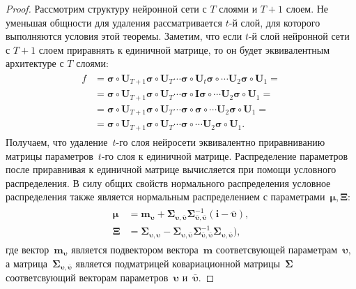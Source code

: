 \documentclass[12pt]{a&t}
\begin{document}
\begin{proof}
Рассмотрим структуру нейронной сети с $T$ слоями и $T+1$ слоем. Не уменьшая общности для удаления рассматривается $t$-й слой, для которого выполняются условия этой теоремы. Заметим, что если $t$-й слой нейронной сети с $T+1$ слоем приравнять к единичной матрице, то он будет эквивалентным архитектуре с $T$ слоями:
\begin{gather}
\label{eq:ap:tr:2:1}
\begin{aligned}
f &= \bm{\sigma} \circ \mathbf{U}_{T+1}\bm{\sigma} \circ \mathbf{U}_T \cdots \bm{\sigma} \circ \mathbf{U}_t\bm{\sigma} \circ \cdots  \mathbf{U}_2\bm{\sigma} \circ \mathbf{U}_1 =\\
&=  \bm{\sigma} \circ \mathbf{U}_{T+1}\bm{\sigma} \circ \mathbf{U}_T \cdots \bm{\sigma} \circ \mathbf{I}\bm{\sigma} \circ \cdots  \mathbf{U}_2\bm{\sigma} \circ \mathbf{U}_1 =\\
&=  \bm{\sigma} \circ \mathbf{U}_{T+1}\bm{\sigma} \circ \mathbf{U}_T \cdots \bm{\sigma} \circ \bm{\sigma} \circ \cdots  \mathbf{U}_2\bm{\sigma} \circ \mathbf{U}_1 =\\
&=  \bm{\sigma} \circ \mathbf{U}_{T+1}\bm{\sigma} \circ \mathbf{U}_T \cdots \bm{\sigma} \circ \cdots  \mathbf{U}_2\bm{\sigma} \circ \mathbf{U}_1.
\end{aligned}
\end{gather}
Получаем, что удаление~$t$-го слоя нейросети эквивалентно приравниванию матрицы параметров~$t$-го слоя к единичной матрице. Распределение параметров после приравнивая к единичной матрице вычисляется при помощи условного распределения. В силу общих свойств нормального распределения условное распределения также является нормальным распределением с параметрами~$\bm{\mu}, \bm{\Xi}:$
\begin{gather}
\label{eq:ap:tr:2:2}
\begin{aligned}
\bm{\mu} &= \mathbf{m}_{\bm{\upsilon}}+\bm{\Sigma}_{\bm{\upsilon},\bar{\bm{\upsilon}}} \bm{\Sigma}_{\bar{\bm{\upsilon}},\bar{\bm{\upsilon}}}^{-1} \left(\mathbf{i} - \bar{\bm{\upsilon}}\right), \\
\bm{\Xi} &= \bm{\Sigma}_{\bm{\upsilon},\bm{\upsilon}} - \bm{\Sigma}_{\bm{\upsilon},\bar{\bm{\upsilon}}}\bm{\Sigma}_{\bar{\bm{\upsilon}},\bar{\bm{\upsilon}}}^{-1}\bm{\Sigma}_{\bm{\upsilon},\bar{\bm{\upsilon}}}\bigr),
\end{aligned}
\end{gather}
где вектор~$\mathbf{m}_{\bm{\upsilon}}$ является подвектором вектора~$\mathbf{m}$ соответсвующей параметрам~$\bm{\upsilon},$ а матрица~$\bm{\Sigma}_{\bm{\upsilon},\bar{\bm{\upsilon}}}$ является подматрицей ковариационной матрицы~$\bm{\Sigma}$ соответсвующий векторам параметров~$\bm{\upsilon}$ и~$\bar{\bm{\upsilon}}.$
\end{proof}
\end{document}
